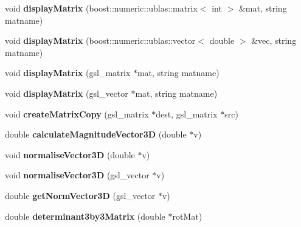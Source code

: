 \begin{DoxyCompactItemize}
\item 
\hypertarget{classShapeBase_a32973247ffcf77c2fd03f5d00c9fda42}{}void {\bfseries display\+Matrix} (boost\+::numeric\+::ublas\+::matrix$<$ int $>$ \&mat, string matname)\label{classShapeBase_a32973247ffcf77c2fd03f5d00c9fda42}

\item 
\hypertarget{classShapeBase_ae121abd34a8206b1f6e6829987ddf5c6}{}void {\bfseries display\+Matrix} (boost\+::numeric\+::ublas\+::vector$<$ double $>$ \&vec, string matname)\label{classShapeBase_ae121abd34a8206b1f6e6829987ddf5c6}

\item 
\hypertarget{classShapeBase_a51b06b089203d187455c97065ad57499}{}void {\bfseries display\+Matrix} (gsl\+\_\+matrix $\ast$mat, string matname)\label{classShapeBase_a51b06b089203d187455c97065ad57499}

\item 
\hypertarget{classShapeBase_af9a10295e67e1f9047d0800ec6b30b0c}{}void {\bfseries display\+Matrix} (gsl\+\_\+vector $\ast$mat, string matname)\label{classShapeBase_af9a10295e67e1f9047d0800ec6b30b0c}

\item 
\hypertarget{classShapeBase_a4b37ec963a6078a7e03512d23470c257}{}void {\bfseries create\+Matrix\+Copy} (gsl\+\_\+matrix $\ast$dest, gsl\+\_\+matrix $\ast$src)\label{classShapeBase_a4b37ec963a6078a7e03512d23470c257}

\item 
\hypertarget{classShapeBase_ac5d2cfe341eceb73f39d90955356f7b8}{}double {\bfseries calculate\+Magnitude\+Vector3\+D} (double $\ast$v)\label{classShapeBase_ac5d2cfe341eceb73f39d90955356f7b8}

\item 
\hypertarget{classShapeBase_afebf3d9e96e28e5272884f09b61eaab3}{}void {\bfseries normalise\+Vector3\+D} (double $\ast$v)\label{classShapeBase_afebf3d9e96e28e5272884f09b61eaab3}

\item 
\hypertarget{classShapeBase_a9e7ca6bbc30107ed82e73694f9c34717}{}void {\bfseries normalise\+Vector3\+D} (gsl\+\_\+vector $\ast$v)\label{classShapeBase_a9e7ca6bbc30107ed82e73694f9c34717}

\item 
\hypertarget{classShapeBase_a38c436dca2006e445f7949bc34f08e3c}{}double {\bfseries get\+Norm\+Vector3\+D} (gsl\+\_\+vector $\ast$v)\label{classShapeBase_a38c436dca2006e445f7949bc34f08e3c}

\item 
\hypertarget{classShapeBase_ade98a5910e7b81ee22da6bcb91262328}{}double {\bfseries determinant3by3\+Matrix} (double $\ast$rot\+Mat)\label{classShapeBase_ade98a5910e7b81ee22da6bcb91262328}


\end{DoxyCompactItemize}
